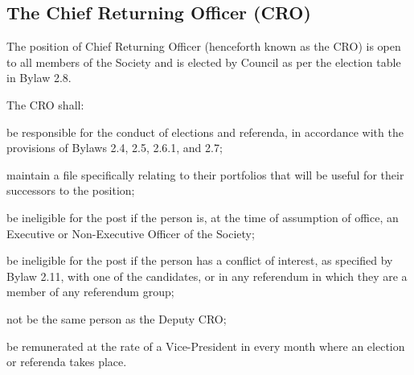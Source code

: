 \subsection {The Chief Returning Officer (CRO)}
\begin{longenum}[ label*=\thesubsection.\arabic*., align=left]
	\item The position of Chief Returning Officer (henceforth known as the CRO) is open to all members of the Society and is elected by Council as per the election table in Bylaw 2.8.
    \item The CRO shall: 
    \begin{longenum}[ label*=\arabic*., align=left]
		\item  be responsible for the conduct of elections and referenda, in accordance with the provisions of Bylaws 2.4, 2.5, 2.6.1, and 2.7; 
		\item maintain a file specifically relating to their portfolios that will be useful for their successors to the position; 
        \item be ineligible for the post if the person is, at the time of assumption of office, an Executive or Non-Executive Officer of the Society; 
        \item be ineligible for the post if the person has a conflict of interest, as specified by Bylaw 2.11, with one of the candidates, or in any referendum in which they are a member of any referendum group;
        \item not be the same person as the Deputy CRO;
        \item be remunerated at the rate of a Vice-President in every month where an election or referenda takes place. 
        \end{longenum}
\end{longenum}

